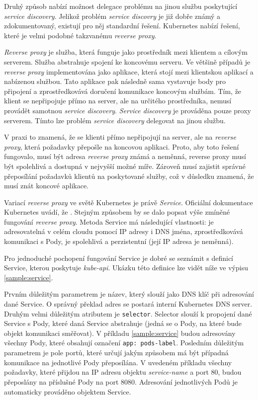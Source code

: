 Druhý způsob nabízí možnost delegace problému na jinou službu poskytující \textit{service discovery}. Jelikož problém \textit{service discovry} je již dobře známý a zdokumentovaný, existují pro něj standardní řešení. Kubernetes nabízí řešení, které je velmi podobné takzvanému \textit{reverse proxy}.


\textit{Reverse proxy} je služba, která funguje jako prostředník mezi klientem a cílovým serverem. Služba abstrahuje spojení ke koncovému serveru. Ve většině případů je \textit{reverse proxy} implementována jako aplikace, která stojí mezi klientskou aplikací a nabízenou službou. Tato aplikace pak následně sama vystavuje body pro připojení a zprostředkovává doručení komunikace koncovým službám. Tím, že klient se nepřipojuje přímo na server, ale na určitého prostředníka, nemusí provádět samotnou \textit{service discovery}. \textit{Service discovery} je prováděna pouze proxy serverem. Tímto lze problém \textit{service discovery} delegovat na jinou službu.

V praxi to znamená, že se klienti přímo nepřipojují na server, ale na \textit{reverse proxy}, která požadavky přepošle na koncovou aplikaci. Proto, aby toto řešení fungovalo, musí být adresa \textit{reverse proxy} známá a neměnná, reverse proxy musí být spolehlivá a dostupná v nejvyšší možné míře. Zároveň musí zajistit správné přeposílání požadavků klientů na poskytované služby, což v důsledku znamená, že musí znát koncové aplikace.\cite{nassimkebbani_2022_the}

\bigskip

Variací \textit{reverse proxy} ve světě Kubernetes je právě \textit{Service}. Oficiální dokumentace Kubernetes uvádí, že  \cite{thekubernetesauthors_2023_service}. Stejným způsobem by se dalo popsat výše zmíněné fungování \textit{reverse proxy}. Metoda Service má následující vlastnosti: je adresovatelná v celém cloudu pomocí IP adresy i DNS jména, zprostředkovává komunikaci s Pody, je spolehlivá a perzistentní (její IP adresa je neměnná).

Pro jednoduché pochopení fungování Service je dobré se seznámit s definicí Service, kterou poskytuje \textit{kube-api}. Ukázku této definice lze vidět níže ve výpisu \ref{sample:service}.


Prvním důležitým parametrem je název, který slouží jako DNS klíč při adresování dané Service. O správný překlad adres se postará interní Kubernetes DNS server. Druhým velmi důležitým atributem je \verb|selector|. Selector slouží k propojení dané Service s Pody, které daná Service abstrahuje (jedná se o Pody, na které bude objekt komunikaci směřovat). V příkladu \ref{sample:service} budou adresovány všechny Pody, které obsahují označení \verb|app: pods-label|. Posledním důležitým parametrem je pole portů, které určují jakým způsobem má být případná komunikace na jednotlivé Pody přeposílána. V uvedeném příkladu všechny požadavky, které přijdou na IP adresu objektu \textit{service-name} a port 80, budou přeposlány na příslušné Pody na port 8080. Adresování jednotlivých Podů je automaticky prováděno objektem Service.

